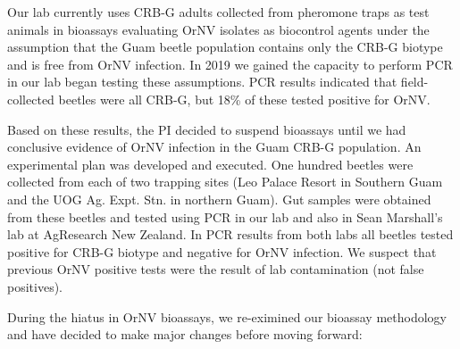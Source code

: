 \documentclass[12pt,letterpaper,english,bibliography=totocnumbered,abstract=on]{scrartcl}
\begin{document}
Our lab currently uses CRB-G adults collected from pheromone traps as test animals in bioassays evaluating OrNV isolates as biocontrol agents under the assumption that the Guam beetle population contains only the CRB-G biotype and is free from OrNV infection. In 2019 we gained the capacity to perform PCR in our lab began testing these assumptions. PCR results indicated that field-collected beetles were all CRB-G, but 18\% of these tested positive for OrNV.

Based on these results, the PI decided to suspend bioassays until we had conclusive evidence of OrNV infection in the Guam CRB-G population.  An experimental plan \cite{mooreExperimentalPlanDetermining2020} was developed and executed. One hundred beetles were collected from each of two trapping sites (Leo Palace Resort in Southern Guam and the UOG Ag. Expt. Stn. in northern Guam). Gut samples were obtained from these beetles and tested using PCR in our lab and also in Sean Marshall's lab at AgResearch New Zealand. In PCR results from both labs all beetles tested positive for CRB-G biotype and negative for OrNV infection. We suspect that previous OrNV positive tests were the result of lab contamination (not false positives). 

During the hiatus in OrNV bioassays, we re-eximined our bioassay methodology and have decided to make major changes before moving forward:
\end{document}
